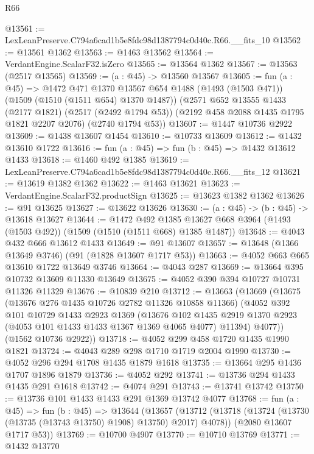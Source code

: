 \begin{lexlean}{R66}
\begin{coremodule}
@13561 := LexLeanPreserve.C794a6cad1b5e8fdc98d1387794c0d40c.R66.__fits_10
@13562 := @13561 @1362
@13563 := @1463 @13562
@13564 := VerdantEngine.ScalarF32.isZero
@13565 := @13564 @1362
@13567 := @13563 (@2517 @13565)
@13569 := (a : @45) -> @13560 @13567
@13605 := fun (a : @45) =>
  @1472
    @471
    @1370
    @13567
    @654
    @1488
    (@1493 (@1503 @471))
    (@1509 (@1510 (@1511 @654) @1370 @1487))
    (@2571
      @652
      @13555
      @1433
      (@2177 @1821)
      (@2517 (@2492 @1794 @53))
      (@2192 @458 @2088 @1435 @1795 @1821 @2207 @2076)
      (@2740 @1794 @53))
@13607 := @1447 @10736 @2922
@13609 := @1438 @13607 @1454
@13610 := @10733 @13609
@13612 := @1432 @13610 @1722
@13616 := fun (a : @45) => fun (b : @45) => @1432 @13612 @1433
@13618 := @1460 @492 @1385
@13619 := LexLeanPreserve.C794a6cad1b5e8fdc98d1387794c0d40c.R66.__fits_12
@13621 := @13619 @1382 @1362
@13622 := @1463 @13621
@13623 := VerdantEngine.ScalarF32.productSign
@13625 := @13623 @1382 @1362
@13626 := @91 @13625
@13627 := @13622 @13626
@13630 := (a : @45) -> (b : @45) -> @13618 @13627
@13644 := @1472
    @492
    @1385
    @13627
    @668
    @3964
    (@1493 (@1503 @492))
    (@1509 (@1510 (@1511 @668) @1385 @1487))
@13648 := @4043 @432 @666 @13612 @1433
@13649 := @91 @13607
@13657 := @13648 (@1366 @13649 @3746) (@91 (@1828 @13607 @1717 @53))
@13663 := @4052 @663 @665 @13610 @1722 @13649 @3746
@13664 := @4043 @287
@13669 := @13664 @395 @10732 @13609 @11330 @13649
@13675 := @4052 @390 @394 @10727 @10731 @11326 @11329
@13676 := @10839 @210
@13712 := @13663
    (@13669
      (@13675
        (@13676 @276 @1435 @10726 @2782 @11326 @10858 @11366)
        (@4052
          @392
          @101
          @10729
          @1433
          @2923
          @1369
          (@13676
            @102
            @1435
            @2919
            @1370
            @2923
            (@4053 @101 @1433 @1433 @1367 @1369 @4065 @4077)
            @11394)
          @4077))
      (@1562 @10736 @2922))
@13718 := @4052 @299 @458 @1720 @1435 @1990 @1821
@13724 := @4043 @289 @298 @1710 @1719 @2004 @1990
@13730 := @4052 @296 @294 @1708 @1435 @1879 @1618
@13735 := @13664 @295 @1436 @1707 @1896 @1879
@13736 := @4052 @292
@13741 := @13736 @294 @1433 @1435 @291 @1618
@13742 := @4074 @291
@13743 := @13741 @13742
@13750 := @13736 @101 @1433 @1433 @291 @1369 @13742 @4077
@13768 := fun (a : @45) =>
  fun (b : @45) =>
  @13644
    (@13657
      (@13712 (@13718 (@13724 (@13730 (@13735 (@13743 @13750) @1908) @13750) @2017) @4078))
      (@2080 @13607 @1717 @53))
@13769 := @10700 @4907
@13770 := @10710 @13769
@13771 := @1432 @13770

\end{coremodule}
\end{lexlean}
